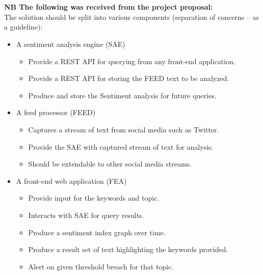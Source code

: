 \documentclass[letterpaper]{article}
\begin{document}
		\vspace{0.2in}
		
		\pagebreak
		
		\section*{\colorbox{blue}{}} 
		
		\vspace{0.2in}
		
		\textbf{NB The following was received from the project proposal:}
		\\\linebreak
		The solution should be split into various components (separation of concerns – as a guideline):
		\begin{itemize}
		\item
		A sentiment analysis engine (SAE)
		\begin{itemize}
		\item
		Provide a REST API for querying from any front-end application.
		\item
		Provide a REST API for storing the FEED text to be analyzed.
		\item
		Produce and store the Sentiment analysis for future queries.
		\end{itemize}
		\end{itemize}
		
		\begin{itemize}
		\item
		A feed processor (FEED)
		\begin{itemize}
		\item
		Captures a stream of text from social media such as Twitter.
		\item
		Provide the SAE with captured stream of text for analysis.
		\item
		Should be extendable to other social media streams.
		\end{itemize}
		\end{itemize}
		
		\begin{itemize}
		\item
		A front-end web application (FEA)
		\begin{itemize}
		\item
		Provide input for the keywords and topic.
		\item
		Interacts with SAE for query results.
		\item
		Produce a sentiment index graph over time.
		\item
		Produce a result set of text highlighting the keywords provided.
		\item
		Alert on given threshold breach for that topic.
		\end{itemize}
		\end{itemize}
		
\end{document}
